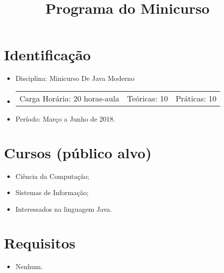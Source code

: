 \documentclass{article}
\title{Programa do Minicurso}
\author{}
\date{}
\begin{document}
\maketitle

\section{Identificação}

\begin{itemize}
    \item[] Disciplina: Minicurso De Java Moderno
    \item[]
        \hspace{-1em}
        \begin{tabular}{ccc}
            Carga Horária: 20 horas-aula&
            Teóricas: 10&
            Práticas: 10
        \end{tabular}
    \item[] Período: Março a Junho de
                     2018.
\end{itemize}

\section{Cursos (público alvo)}
\begin{itemize}
    \item[] Ciência da Computação;
    \item[] Sistemas de Informação;
    \item[] Interessados na linguagem Java.
\end{itemize}

\section{Requisitos}
\begin{itemize}
    \item[] Nenhum.
\end{itemize}
\end{document}
